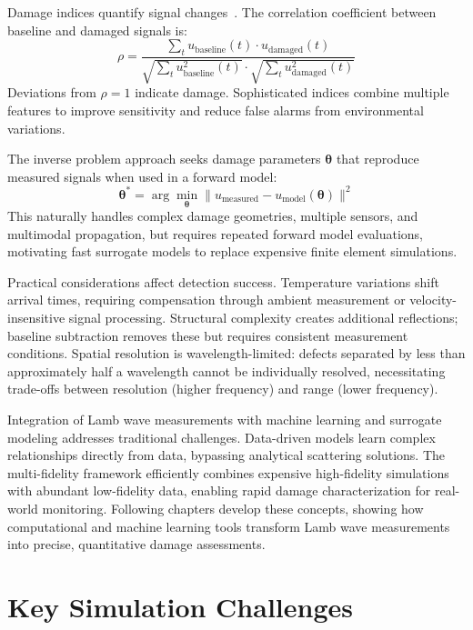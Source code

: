 \documentclass[12pt,a4paper]{report}
\begin{document}
Damage indices quantify signal changes~\cite{su2009}. The correlation coefficient between baseline and damaged signals is:
\begin{equation}
\rho = \frac{\sum_{t} u_{\text{baseline}}(t) \cdot u_{\text{damaged}}(t)}{\sqrt{\sum_{t} u_{\text{baseline}}^2(t)} \cdot \sqrt{\sum_{t} u_{\text{damaged}}^2(t)}}
\end{equation}
Deviations from $\rho = 1$ indicate damage. Sophisticated indices combine multiple features to improve sensitivity and reduce false alarms from environmental variations.

The inverse problem approach seeks damage parameters $\boldsymbol{\theta}$ that reproduce measured signals when used in a forward model:
\begin{equation}
\boldsymbol{\theta}^* = \arg\min_{\boldsymbol{\theta}} \| u_{\text{measured}} - u_{\text{model}}(\boldsymbol{\theta}) \|^2
\end{equation}
This naturally handles complex damage geometries, multiple sensors, and multimodal propagation, but requires repeated forward model evaluations, motivating fast surrogate models to replace expensive finite element simulations.

Practical considerations affect detection success. Temperature variations shift arrival times, requiring compensation through ambient measurement or velocity-insensitive signal processing. Structural complexity creates additional reflections; baseline subtraction removes these but requires consistent measurement conditions. Spatial resolution is wavelength-limited: defects separated by less than approximately half a wavelength cannot be individually resolved, necessitating trade-offs between resolution (higher frequency) and range (lower frequency).

Integration of Lamb wave measurements with machine learning and surrogate modeling addresses traditional challenges. Data-driven models learn complex relationships directly from data, bypassing analytical scattering solutions. The multi-fidelity framework efficiently combines expensive high-fidelity simulations with abundant low-fidelity data, enabling rapid damage characterization for real-world monitoring. Following chapters develop these concepts, showing how computational and machine learning tools transform Lamb wave measurements into precise, quantitative damage assessments.

\section{Key Simulation Challenges}
\end{document}
